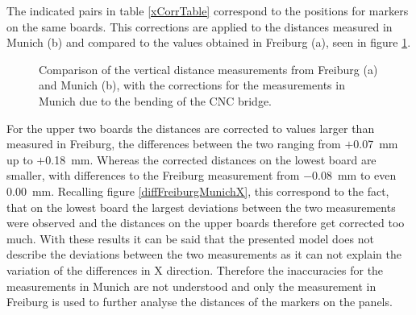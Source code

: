 \documentclass[
a4paper,                                %
twoside,                                %
BCOR1.4cm,                      %
10pt,                           %
headings=normal,                %
headsepline,                    %
clearplainpage, %
final,                                  %
div=14,
parskip=full,
openright,
bibliography=toc
]{scrreprt}
\begin{document}
The indicated pairs in table \ref{xCorrTable} correspond to the positions for markers on the same boards. This corrections are applied to the distances measured in Munich (b) and compared to the values obtained in Freiburg (a), seen in figure \ref{panelXFreiburgMunichCor}.

\begin{figure}[H]	
	\centering
	\qquad
	\caption{Comparison of the vertical distance measurements from Freiburg (a) and Munich (b), with the corrections for the measurements in Munich due to the bending of the CNC bridge.}
	\label{panelXFreiburgMunichCor}
\end{figure}

For the upper two boards the distances are corrected to values larger than measured in Freiburg, the differences between the two ranging from $+$\SI{0.07}{\mm} up to $+$\SI{0.18}{\mm}. Whereas the corrected distances on the lowest board are smaller, with differences to the Freiburg measurement from \SI{-0.08}{\mm} to even \SI{0.00}{\mm}. Recalling figure \ref{diffFreiburgMunichX}, this correspond to the fact, that on the lowest board the largest deviations between the two measurements were observed and the distances on the upper boards therefore get corrected too much. With these results it can be said that the presented model does not describe the deviations between the two measurements as it can not explain the variation of the differences in X direction. Therefore the inaccuracies for the measurements in Munich are not understood and only the measurement in Freiburg is used to further analyse the distances of the markers on the panels. 

\end{document}
